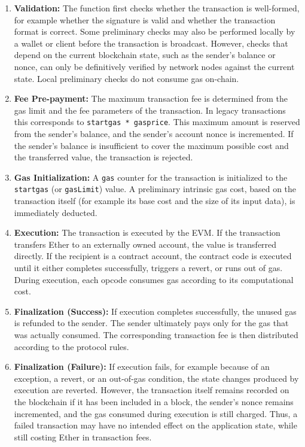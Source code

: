 \documentclass{scrbook}
\begin{document}
\begin{enumerate}
    \item \textbf{Validation:} The function first checks whether the transaction is well-formed, for example whether the signature is valid and whether the transaction format is correct. Some preliminary checks may also be performed locally by a wallet or client before the transaction is broadcast. However, checks that depend on the current blockchain state, such as the sender's balance or nonce, can only be definitively verified by network nodes against the current state. Local preliminary checks do not consume gas on-chain.

    \item \textbf{Fee Pre-payment:} The maximum transaction fee is determined from the gas limit and the fee parameters of the transaction. In legacy transactions this corresponds to \texttt{startgas * gasprice}. This maximum amount is reserved from the sender's balance, and the sender's account nonce is incremented. If the sender's balance is insufficient to cover the maximum possible cost and the transferred value, the transaction is rejected.

    \item \textbf{Gas Initialization:} A \texttt{gas} counter for the transaction is initialized to the \texttt{startgas} (or \texttt{gasLimit}) value. A preliminary intrinsic gas cost, based on the transaction itself (for example its base cost and the size of its input data), is immediately deducted.

    \item \textbf{Execution:} The transaction is executed by the EVM. If the transaction transfers Ether to an externally owned account, the value is transferred directly. If the recipient is a contract account, the contract code is executed until it either completes successfully, triggers a revert, or runs out of gas. During execution, each opcode consumes gas according to its computational cost.

    \item \textbf{Finalization (Success):} If execution completes successfully, the unused gas is refunded to the sender. The sender ultimately pays only for the gas that was actually consumed. The corresponding transaction fee is then distributed according to the protocol rules.

    \item \textbf{Finalization (Failure):} If execution fails, for example because of an exception, a revert, or an out-of-gas condition, the state changes produced by execution are reverted. However, the transaction itself remains recorded on the blockchain if it has been included in a block, the sender's nonce remains incremented, and the gas consumed during execution is still charged. Thus, a failed transaction may have no intended effect on the application state, while still costing Ether in transaction fees.
\end{enumerate}
\end{document}
